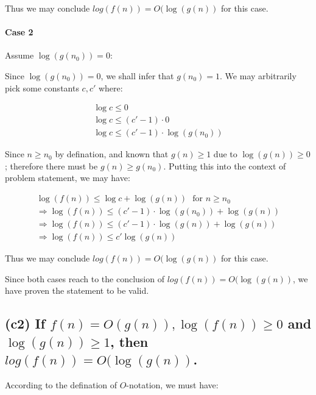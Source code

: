 \documentclass[12pt]{article}
\begin{document}
Thus we may conclude $log(f(n)) = O(\log(g(n))$ for this case.


\paragraph{Case 2} Assume $\log (g(n_{0})) = 0$:

Since $\log (g(n_{0})) = 0$, we shall infer that $g(n_{0}) = 1$. We may arbitrarily pick some constants $c, c'$ where:

\begin{gather}
    \log c \leq 0 \nonumber\\
    \log c \leq (c' - 1) \cdot 0 \nonumber\\
    \log c \leq (c' - 1) \cdot \log(g(n_{0}))
\end{gather}

Since $n \geq n_{0}$ by defination, and known that $g(n) \geq 1$ due to $\log(g(n)) \geq 0$; therefore there must be $g(n) \geq g(n_{0})$. Putting this into the context of problem statement, we may have:

\begin{gather}
    \log(f(n)) \leq \log c + \log(g(n)) \ \ \ \text{for $n \geq n_{0}$} \nonumber \\
    \Rightarrow \log(f(n)) \leq (c' - 1) \cdot \log(g(n_{0})) + \log(g(n)) \nonumber \\
    \Rightarrow \log(f(n)) \leq (c' - 1) \cdot \log(g(n)) + \log(g(n)) \nonumber \\
    \Rightarrow \log(f(n)) \leq c'\log(g(n))
\end{gather}

Thus we may conclude $log(f(n)) = O(\log(g(n))$ for this case.\newline

Since both cases reach to the conclusion of $log(f(n)) = O(\log(g(n))$, we have proven the statement to be valid.



\subsection{(c2) If $f(n) = O(g(n)), \log(f(n)) \geq 0$ and $\log(g(n)) \geq 1$, then $log(f(n)) = O(\log(g(n))$.}



According to the defination of $O$-notation, we must have:
\end{document}
